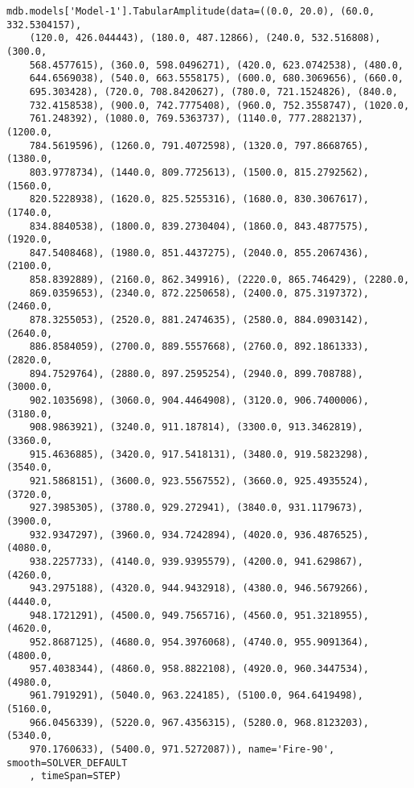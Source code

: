 \documentclass[12pt, letterpaper, oneside]{report}
\begin{document}
\begin{lstlisting}[frame=none]
mdb.models['Model-1'].TabularAmplitude(data=((0.0, 20.0), (60.0, 332.5304157), 
    (120.0, 426.044443), (180.0, 487.12866), (240.0, 532.516808), (300.0, 
    568.4577615), (360.0, 598.0496271), (420.0, 623.0742538), (480.0, 
    644.6569038), (540.0, 663.5558175), (600.0, 680.3069656), (660.0, 
    695.303428), (720.0, 708.8420627), (780.0, 721.1524826), (840.0, 
    732.4158538), (900.0, 742.7775408), (960.0, 752.3558747), (1020.0, 
    761.248392), (1080.0, 769.5363737), (1140.0, 777.2882137), (1200.0, 
    784.5619596), (1260.0, 791.4072598), (1320.0, 797.8668765), (1380.0, 
    803.9778734), (1440.0, 809.7725613), (1500.0, 815.2792562), (1560.0, 
    820.5228938), (1620.0, 825.5255316), (1680.0, 830.3067617), (1740.0, 
    834.8840538), (1800.0, 839.2730404), (1860.0, 843.4877575), (1920.0, 
    847.5408468), (1980.0, 851.4437275), (2040.0, 855.2067436), (2100.0, 
    858.8392889), (2160.0, 862.349916), (2220.0, 865.746429), (2280.0, 
    869.0359653), (2340.0, 872.2250658), (2400.0, 875.3197372), (2460.0, 
    878.3255053), (2520.0, 881.2474635), (2580.0, 884.0903142), (2640.0, 
    886.8584059), (2700.0, 889.5557668), (2760.0, 892.1861333), (2820.0, 
    894.7529764), (2880.0, 897.2595254), (2940.0, 899.708788), (3000.0, 
    902.1035698), (3060.0, 904.4464908), (3120.0, 906.7400006), (3180.0, 
    908.9863921), (3240.0, 911.187814), (3300.0, 913.3462819), (3360.0, 
    915.4636885), (3420.0, 917.5418131), (3480.0, 919.5823298), (3540.0, 
    921.5868151), (3600.0, 923.5567552), (3660.0, 925.4935524), (3720.0, 
    927.3985305), (3780.0, 929.272941), (3840.0, 931.1179673), (3900.0, 
    932.9347297), (3960.0, 934.7242894), (4020.0, 936.4876525), (4080.0, 
    938.2257733), (4140.0, 939.9395579), (4200.0, 941.629867), (4260.0, 
    943.2975188), (4320.0, 944.9432918), (4380.0, 946.5679266), (4440.0, 
    948.1721291), (4500.0, 949.7565716), (4560.0, 951.3218955), (4620.0, 
    952.8687125), (4680.0, 954.3976068), (4740.0, 955.9091364), (4800.0, 
    957.4038344), (4860.0, 958.8822108), (4920.0, 960.3447534), (4980.0, 
    961.7919291), (5040.0, 963.224185), (5100.0, 964.6419498), (5160.0, 
    966.0456339), (5220.0, 967.4356315), (5280.0, 968.8123203), (5340.0, 
    970.1760633), (5400.0, 971.5272087)), name='Fire-90', smooth=SOLVER_DEFAULT
    , timeSpan=STEP)
	

\end{lstlisting}
\end{document}
